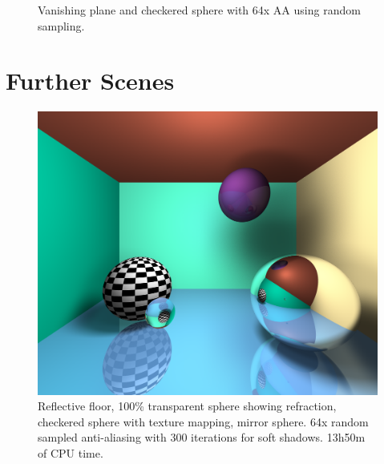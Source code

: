 \documentclass{article}
\begin{document}
\begin{figure}[H]
    \centering
    \caption{Vanishing plane and checkered sphere with 64x AA using random sampling.}
    \label{fig:64random}
\end{figure}

\section{Further Scenes}

\begin{figure}[H]
    \includegraphics[width=\textwidth]{./examples/SphereRoom.png}
    \caption{Reflective floor, 100\% transparent sphere showing refraction, checkered sphere with texture mapping, mirror sphere. 64x random sampled anti-aliasing with 300 iterations for soft shadows. 13h50m of CPU time.}
\end{figure}
\end{document}
